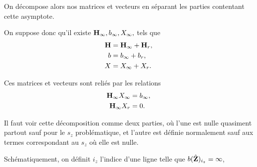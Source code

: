 On décompose alors nos matrices et vecteurs en séparant les parties contentant cette asymptote.

On suppose donc qu'il existe \({\mathbf{H}}_\infty, {b}_\infty, X_\infty,\) tels que
\begin{align*}
  {\mathbf{H}} &= {\mathbf{H}}_\infty + {\mathbf{H}}_r,
  \\
  {b} &= {b}_\infty + {b}_r,
  \\
  X &= X_\infty + X_r.
\end{align*}

Ces matrices et vecteurs sont reliés par les relations
\begin{align}
  {\mathbf{H}}_\infty X_\infty &= {b}_\infty,
  \\
  {\mathbf{H}}_\infty X_r &= 0.
\end{align}

Il faut voir cette décomposition comme deux parties, où l'une est nulle quasiment partout sauf pour le \(s_z\) problématique, et l'autre est définie normalement sauf aux termes correspondant au \(s_z\) où elle est nulle.

Schématiquement, on définit \(i_z\) l'indice d'une ligne telle que \({b}(\hat{\mathbf{Z}})_{i_z} = \infty\), 

